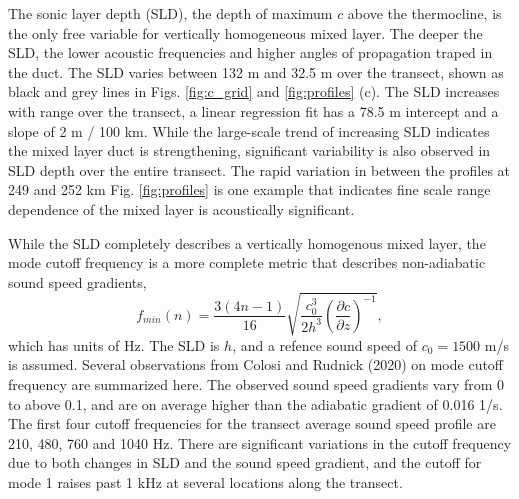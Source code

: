 \documentclass[preprint,NumberedRefs]{JASA}
\begin{document}
The sonic layer depth (SLD), the depth of maximum $c$ above the thermocline, is the only free variable for vertically homogeneous mixed layer. The deeper the SLD, the lower acoustic frequencies and higher angles of propagation traped in the duct. The SLD varies between 132 m and 32.5 m over the transect, shown as black and grey lines in Figs. \ref{fig:c_grid} and \ref{fig:profiles} (c). The SLD increases with range over the transect, a linear regression fit has a 78.5 m intercept and a slope of 2 m / 100 km. While the large-scale trend of increasing SLD indicates the mixed layer duct is strengthening, significant variability is also observed in SLD depth over the entire transect. The rapid variation in between the profiles at 249 and 252 km Fig. \ref{fig:profiles} is one example that indicates fine scale range dependence of the mixed layer is acoustically significant.

While the SLD completely describes a vertically homogenous mixed layer, the mode cutoff frequency\citep{Urick1982Prop} is a more complete metric that describes non-adiabatic sound speed gradients,
\begin{equation}
    f_{min}(n) = \frac{3(4n-1)}{16} \sqrt{\frac{c_0^3}{2h^3} \left( \frac{\partial c}{\partial z} \right) ^ {-1}},
    \label{eq:f_cutoff}
\end{equation}
which has units of Hz. The SLD is $h$, and a refence sound speed of $c_0 = 1500$ m/s is assumed. Several observations from Colosi and Rudnick (2020)\cite{colosi2020observations} on mode cutoff frequency are summarized here. The observed sound speed gradients vary from 0 to above 0.1, and are on average higher than the adiabatic gradient of 0.016 1/s. The first four cutoff frequencies for the transect average sound speed profile are 210, 480, 760 and 1040 Hz. There are significant variations in the cutoff frequency due to both changes in SLD and the sound speed gradient, and the cutoff for mode 1 raises past 1 kHz at several locations along the transect.
\end{document}
